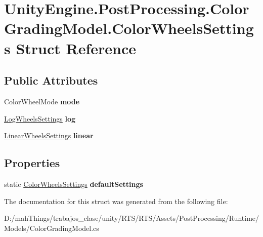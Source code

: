 \hypertarget{struct_unity_engine_1_1_post_processing_1_1_color_grading_model_1_1_color_wheels_settings}{}\section{Unity\+Engine.\+Post\+Processing.\+Color\+Grading\+Model.\+Color\+Wheels\+Settings Struct Reference}
\label{struct_unity_engine_1_1_post_processing_1_1_color_grading_model_1_1_color_wheels_settings}
\subsection*{Public Attributes}
\begin{DoxyCompactItemize}
\item 
\mbox{\label{struct_unity_engine_1_1_post_processing_1_1_color_grading_model_1_1_color_wheels_settings_a1585463b103bd02972e8d8f1a22e3bf1}} 
Color\+Wheel\+Mode {\bfseries mode}
\item 
\mbox{\label{struct_unity_engine_1_1_post_processing_1_1_color_grading_model_1_1_color_wheels_settings_a4e850e98ea6605f15205c1c570c70ef8}} 
\mbox{\hyperlink{struct_unity_engine_1_1_post_processing_1_1_color_grading_model_1_1_log_wheels_settings}{Log\+Wheels\+Settings}} {\bfseries log}
\item 
\mbox{\label{struct_unity_engine_1_1_post_processing_1_1_color_grading_model_1_1_color_wheels_settings_a854d17dcc8e666c1b2d83c929f51d60e}} 
\mbox{\hyperlink{struct_unity_engine_1_1_post_processing_1_1_color_grading_model_1_1_linear_wheels_settings}{Linear\+Wheels\+Settings}} {\bfseries linear}
\end{DoxyCompactItemize}
\subsection*{Properties}
\begin{DoxyCompactItemize}
\item 
\mbox{\label{struct_unity_engine_1_1_post_processing_1_1_color_grading_model_1_1_color_wheels_settings_a33abb6c6ab3bff855b18c53f85bf392b}} 
static \mbox{\hyperlink{struct_unity_engine_1_1_post_processing_1_1_color_grading_model_1_1_color_wheels_settings}{Color\+Wheels\+Settings}} {\bfseries default\+Settings}
\end{DoxyCompactItemize}


The documentation for this struct was generated from the following file\+:\begin{DoxyCompactItemize}
\item 
D\+:/mah\+Things/trabajos\+\_\+clase/unity/\+R\+T\+S/\+R\+T\+S/\+Assets/\+Post\+Processing/\+Runtime/\+Models/Color\+Grading\+Model.\+cs\end{DoxyCompactItemize}
